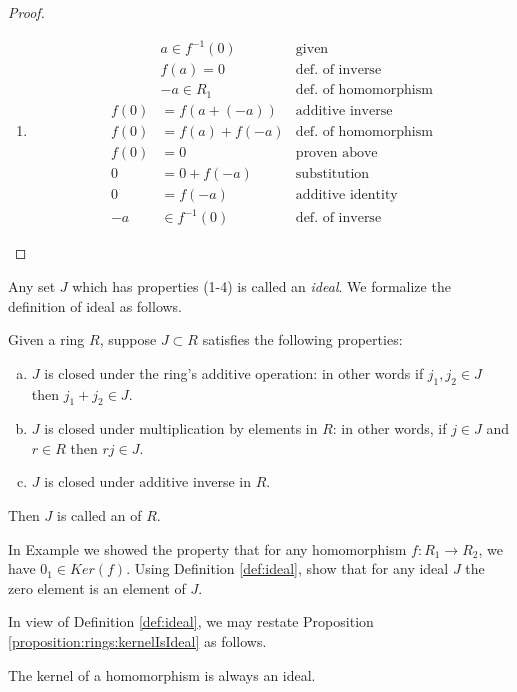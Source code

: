 \begin{prop}
\begin{proof}
\begin{enumerate}
\item
\begin{align*}
&a\in f^{-1}(0) & \text{given}\\
&f(a)=0 & \text{def. of inverse}\\
&-a\in R_1 & \text{def. of homomorphism}\\
f(0)&=f(a+(-a)) & \text{additive inverse}\\
f(0)&=f(a)+f(-a) & \text{def. of homomorphism}\\
f(0)&=0 & \text{proven above}\\
0&=0+f(-a) & \text{substitution}\\
0&=f(-a) & \text{additive identity}\\
-a&\in f^{-1}(0) & \text{def. of inverse}
\end{align*}
\end{enumerate}
\end{proof}
\end{prop}

Any set $J$ which has properties (1-4) is called an \textit{ideal}.  We formalize the definition of ideal as follows.

\begin{defn}\label{def:ideal}
Given a ring $R$, suppose $J \subset R$ satisfies the following properties:
\begin{enumerate}[(a)]
\item $J$ is closed under the ring's additive operation:  in other words if $j_1,j_2\in J$ then $j_1+j_2\in J$.
\item $J$ is closed under multiplication by elements in $R$:  in other words, if $j\in J$ and $r\in R$ then $rj\in J$.
\item $J$ is closed under additive inverse in $R$.
\end{enumerate}
Then $J$ is called an  of $R$.
\end{defn}

\begin{exercise}
In Example we showed the property that for any homomorphism $f:R_1\rightarrow R_2$, we have $0_1\in Ker(f)$.  Using Definition \ref{def:ideal}, show that for any ideal $J$ the zero element is an element of $J$. 
\end{exercise}

In view of Definition \ref{def:ideal}, we may restate Proposition \ref{proposition:rings:kernelIsIdeal} as follows.

\begin{prop}\label{proposition:rings:kernel_ideal}
The kernel of a homomorphism is always an ideal.
\end{prop}

